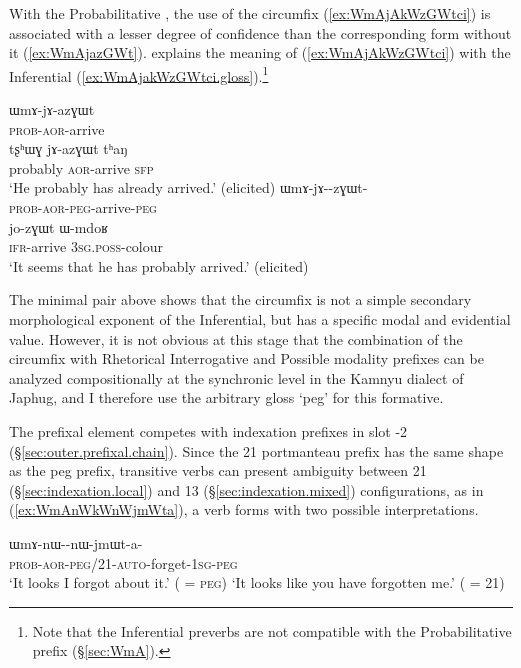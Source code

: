 With the Probabilitative , the use of the circumfix (\ref{ex:WmAjAkWzGWtci}) is associated with a lesser degree of confidence than the corresponding form without it (\ref{ex:WmAjazGWt}).  explains the meaning of (\ref{ex:WmAjAkWzGWtci}) with the Inferential (\ref{ex:WmAjakWzGWtci.gloss}).\footnote{
Note that the Inferential preverbs are not compatible with the Probabilitative prefix (§\ref{sec:WmA}). }
 
\begin{exe}
 \ex 
\begin{xlist}
 \ex \label{ex:WmAjazGWt}
\gll ɯmɤ-jɤ-azɣɯt  \\
\textsc{prob}-\textsc{aor}-arrive \\
\ex \label{ex:WmAjazGWt.gloss}
\gll tʂʰɯɣ jɤ-azɣɯt tʰaŋ\\
probably \textsc{aor}-arrive  \textsc{sfp} \\
\glt `He probably has already arrived.' (elicited)
 \ex \label{ex:WmAjAkWzGWtci}
\gll ɯmɤ-jɤ--zɣɯt-  \\
\textsc{prob}-\textsc{aor}-\textsc{peg}-arrive-\textsc{peg} \\
\ex \label{ex:WmAjakWzGWtci.gloss}
\gll jo-zɣɯt ɯ-mdoʁ \\
\textsc{ifr}-arrive \textsc{3sg}.\textsc{poss}-colour \\
\glt `It seems that he has probably arrived.'  (elicited)
\end{xlist}
\end{exe}

The  minimal pair above shows that the circumfix is not a simple secondary morphological exponent of the Inferential, but has a specific modal and evidential value. However, it is not obvious at this stage that the combination of the circumfix with Rhetorical Interrogative and Possible modality prefixes can be analyzed compositionally at the synchronic level in the Kamnyu dialect of Japhug, and I therefore use the arbitrary gloss `peg' for this formative.

The  prefixal element competes with indexation prefixes in slot -2 (§\ref{sec:outer.prefixal.chain}). Since the 2\fl{}1 portmanteau  prefix has the same shape as the peg prefix, transitive verbs can present ambiguity between 2\fl{}1 (§\ref{sec:indexation.local}) and 1\fl{}3 (§\ref{sec:indexation.mixed}) configurations, as in (\ref{ex:WmAnWkWnWjmWta}), a verb forms with two possible interpretations.

\begin{exe}
\ex \label{ex:WmAnWkWnWjmWta}
\gll ɯmɤ-nɯ--nɯ-jmɯt-a- \\
\textsc{prob}-\textsc{aor}-\textsc{peg}/2\fl{}1-\textsc{auto}-forget-\textsc{1sg}-\textsc{peg} \\
\glt `It looks I forgot about it.' ( = \textsc{peg})
\glt `It looks like you have forgotten me.' ( = 2\fl{}1)
\end{exe}


